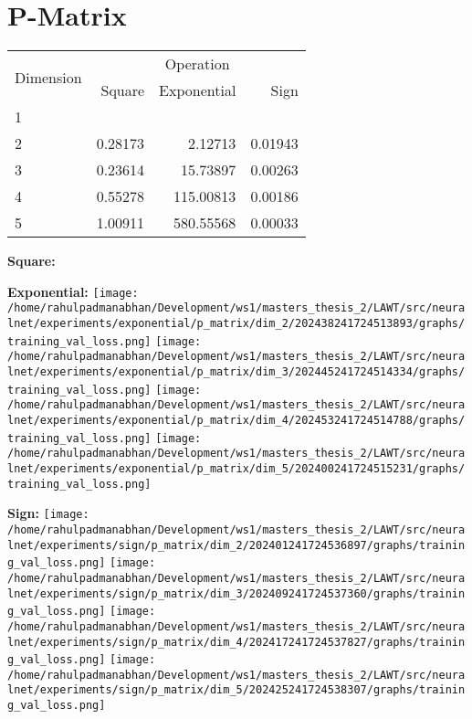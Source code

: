 \documentclass{article}
\begin{document}
\pagebreak
\section{P-Matrix}
\begin{tabular}{@{}lrrr@{}}
\toprule
\multirow{2}{*}{Dimension} & \multicolumn{3}{c}{Operation} \\
\cmidrule(l){2-4}
& Square & Exponential & Sign \\
\midrule
1 & & & \\
2 & 0.28173 & 2.12713 & 0.01943 \\
3 & 0.23614 & 15.73897 & 0.00263 \\
4 & 0.55278 & 115.00813 & 0.00186 \\
5 & 1.00911 & 580.55568 & 0.00033 \\
\bottomrule
\end{tabular}

\textbf{Square:}

\textbf{Exponential:}
\texttt{[image: /home/rahulpadmanabhan/Development/ws1/masters\_thesis\_2/LAWT/src/neuralnet/experiments/exponential/p\_matrix/dim\_2/202438241724513893/graphs/training\_val\_loss.png]}
\texttt{[image: /home/rahulpadmanabhan/Development/ws1/masters\_thesis\_2/LAWT/src/neuralnet/experiments/exponential/p\_matrix/dim\_3/202445241724514334/graphs/training\_val\_loss.png]}
\texttt{[image: /home/rahulpadmanabhan/Development/ws1/masters\_thesis\_2/LAWT/src/neuralnet/experiments/exponential/p\_matrix/dim\_4/202453241724514788/graphs/training\_val\_loss.png]}
\texttt{[image: /home/rahulpadmanabhan/Development/ws1/masters\_thesis\_2/LAWT/src/neuralnet/experiments/exponential/p\_matrix/dim\_5/202400241724515231/graphs/training\_val\_loss.png]}

\textbf{Sign:}
\texttt{[image: /home/rahulpadmanabhan/Development/ws1/masters\_thesis\_2/LAWT/src/neuralnet/experiments/sign/p\_matrix/dim\_2/202401241724536897/graphs/training\_val\_loss.png]}
\texttt{[image: /home/rahulpadmanabhan/Development/ws1/masters\_thesis\_2/LAWT/src/neuralnet/experiments/sign/p\_matrix/dim\_3/202409241724537360/graphs/training\_val\_loss.png]}
\texttt{[image: /home/rahulpadmanabhan/Development/ws1/masters\_thesis\_2/LAWT/src/neuralnet/experiments/sign/p\_matrix/dim\_4/202417241724537827/graphs/training\_val\_loss.png]}
\texttt{[image: /home/rahulpadmanabhan/Development/ws1/masters\_thesis\_2/LAWT/src/neuralnet/experiments/sign/p\_matrix/dim\_5/202425241724538307/graphs/training\_val\_loss.png]}
\end{document}
